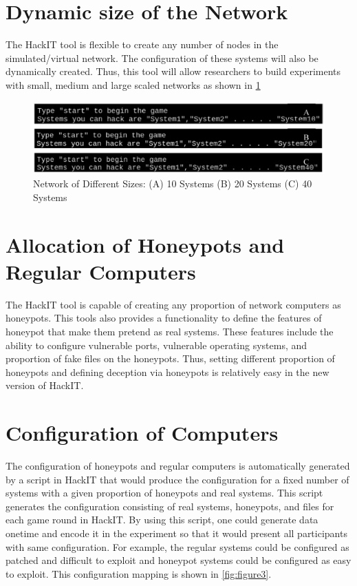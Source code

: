 \section{Dynamic size of the Network}
The HackIT tool is flexible to create any number of nodes in the simulated/virtual network. The configuration of these systems will also be dynamically created. Thus, this tool will allow researchers to build experiments with small, medium and large scaled networks as shown in \ref{fig:figure4}
\FloatBarrier
\begin{figure}[!htbp]
\centering
  \includegraphics[scale=0.5]{Chap2/size.jpg}
  \caption{Network of Different Sizes: (A) 10 Systems (B) 20 Systems (C) 40 Systems}\label{fig:figure4}
\end{figure}     
\section{Allocation of Honeypots and Regular Computers}
The HackIT tool is capable of creating any proportion of network computers as honeypots. This tools also provides a functionality to define the features of honeypot that make them pretend as real systems. These features include the ability to configure vulnerable ports, vulnerable operating systems, and proportion of fake files on the honeypots. Thus, setting different proportion of honeypots and defining deception via honeypots is relatively easy in the new version of HackIT.
\section{Configuration of Computers}
The configuration of honeypots and regular computers is automatically generated by a script in HackIT that would produce the configuration for a fixed number of systems with a given proportion of honeypots and real systems. This script generates the configuration consisting of real systems, honeypots, and files for each game round in HackIT. By using this script, one could generate data onetime and encode it in the experiment so that it would present all participants with same configuration. For example, the regular systems could be configured as patched and difficult to exploit and honeypot systems could be configured as easy to exploit. This configuration mapping is shown in \ref{fig:figure3}.

